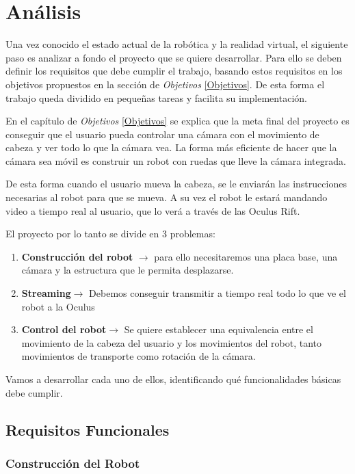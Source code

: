 \documentclass[twoside, 11pt]{epstfg}
\begin{document}
\chapter{Análisis}
\label{chap:sistemadesarrollado}
Una vez conocido el estado actual de la robótica y la realidad virtual, el siguiente paso es analizar a fondo el proyecto que se quiere desarrollar.
Para ello se deben definir los requisitos que debe cumplir el trabajo, basando estos requisitos en los objetivos propuestos en la sección de \textit{Objetivos} \ref{Objetivos}. De esta forma el trabajo queda dividido en pequeñas tareas y facilita su implementación.

En el capítulo de \textit{Objetivos} \ref{Objetivos} se explica que la meta final del proyecto es conseguir que el usuario pueda controlar una cámara con el movimiento de cabeza y ver todo lo que la cámara vea.
La forma más eficiente de hacer que la cámara sea móvil es construir un robot con ruedas que lleve la cámara integrada. 

De esta forma cuando el usuario mueva la cabeza, se le enviarán las instrucciones necesarias al robot para que se mueva. A su vez el robot le estará mandando video a tiempo real al usuario, que lo verá a través de las Oculus Rift.


El proyecto por lo tanto se divide en 3 problemas:
\begin{enumerate}
	\item \textbf{Construcción del robot} $\rightarrow$ para ello necesitaremos una placa base, una cámara y la estructura que le permita desplazarse.
	\item \textbf{Streaming}$\rightarrow$ Debemos conseguir transmitir a tiempo real todo lo que ve el robot a la Oculus
	\item \textbf{Control del robot}$\rightarrow$ Se quiere establecer una equivalencia entre el movimiento de la cabeza del usuario y los movimientos del robot, tanto movimientos de transporte como rotación de la cámara.
\end{enumerate}

Vamos a desarrollar cada uno de ellos, identificando qué funcionalidades básicas debe cumplir.

\section{Requisitos Funcionales}

\subsection{Construcción del Robot}
\end{document}

